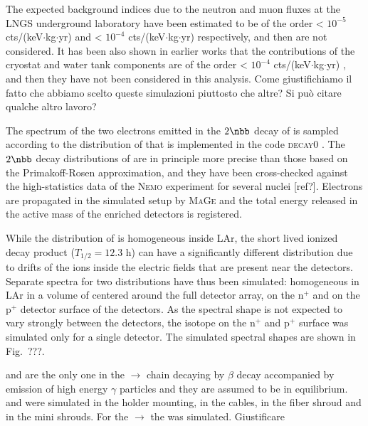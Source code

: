 The expected background indices due to the neutron and muon fluxes at the LNGS underground laboratory have been estimated to be of the order < $10^{−5}$ cts/(keV$\cdot$kg$\cdot$yr) \cite{neutronsBI} and < $10^{−4}$ cts/(keV$\cdot$kg$\cdot$yr) \cite{muonsBI} respectively, and then are not considered. It has been also shown in earlier works that the contributions of the cryostat and water tank components are of the order < $10^{−4}$ cts/(keV$\cdot$kg$\cdot$yr) \cite{criowaterBI}, and then they have not been considered in this analysis. {\color{red}Come giustifichiamo il fatto che abbiamo scelto queste simulazioni piuttosto che altre? Si può citare qualche altro lavoro?}

\marginnote{$2\nbb$} The spectrum of the two electrons emitted in the $2\nbb$ decay of  is sampled according to the distribution of \cite{tables2nbb} that is implemented in the code \textsc{decay0} \cite{decay0}. The $2\nbb$ decay distributions of \cite{tables2nbb} are in principle more precise than those based on the Primakoff-Rosen approximation, and they have been cross-checked against the high-statistics data of the \textsc{Nemo} experiment for several nuclei {\color{red}[ref?]}. Electrons are propagated in the {\gerda} simulated setup by \textsc{MaGe} and the total energy released in the active mass of the enriched detectors is registered.

 While the distribution of  is homogeneous inside LAr, the short lived ionized decay product  ($T_{1/2} = 12.3$ h) can have a significantly different distribution due to drifts of the  ions inside the electric fields that are present near the detectors. Separate spectra for two  distributions have thus been simulated: homogeneous in LAr in a volume of centered around the full detector array, on the n$^+$ and on the p$^+$ detector surface of the detectors. As the spectral shape is not expected to vary strongly between the detectors, the isotope on the n$^+$ and p$^+$ surface was simulated only for a single detector. The simulated spectral shapes are shown in Fig.~{\color{red}???}.

  and  are the only one in the  $\rightarrow$  chain decaying by $\beta$ decay accompanied by emission of high energy $\gamma$ particles and they are assumed to be in equilibrium.  and  were simulated in the holder mounting, in the cables, in the fiber shroud and in the mini shrouds. For the  $\rightarrow$  the  was simulated. {\color{red}Giustificare}

